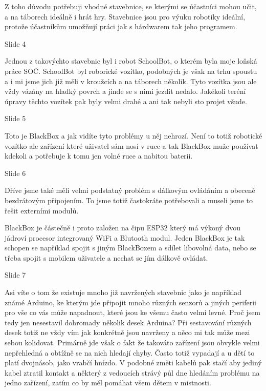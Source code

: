 Z toho důvodu potřebuji 
vhodné stavebnice, se kterými se účastníci mohou učit, a na táborech ideálně i hrát hry.
Stavebnice jsou pro výuku robotiky ideální, protože účastníkům umožňují práci jak 
s hárdwarem tak jeho programem.

Slide 4

Jednou z takovýchto stavebnic byl i robot SchoolBot, o kterém byla moje loňská práce SOČ.
SchoolBot byl roborické vozítko, podobných je však na trhu spoustu a i mi jsme jich již měli v kroužcích
a na táborech několik. Tyto vozítka jsou ale vždy vázány na hladký povrch a jinde se s nimi jezdit nedalo.
Jakékoli teréní úpravy těchto vozítek pak byly velmi drahé a ani tak nebyli sto projet všude.

Slide 5

Toto je BlackBox a jak vidíte tyto problémy u něj nehrozí. Není to totiž robotické vozítko ale zařízení které uživatel
sám nosí v ruce a tak BlackBox muže používat kdekoli a potřebuje k tomu jen volné ruce a nabitou baterii.



Slide 6

Dříve jsme také měli velmi podstatný problém s dálkovým ovládáním a obeceně bezdrátovým připojením.
To jsme totiž častokráte potřebovali a museli jsme to řešit externími modulů.

BlackBox je částečně i proto založen na čipu ESP32 který má výkoný dvou jádroví procesor integrovaný WiFi a Blutooth modul. 
Jeden BlackBox je tak schopen se například spojit s jiným BlackBoxem a sdílet libovolná data, 
nebo se třeba spojit s mobilem uživatele a nechat se jím dálkově ovládat. %



Slide 7

Asi víte o tom že existuje mnoho již navržených stavebnic jako je například známé Arduino, 
ke kterým jde připojit mnoho různých senzorů a jiných periferii pro vše co vás může napadnout, které jsou ke všemu 
často velmi levné. 
Proč jsem tedy jen nesestavil dohromady několik desek Arduina? Při sestavování různých desek
totiž ne vždy vím jak konkrétně jsou navrženy a něco mi tak může mezi sebou kolidovat.
Primárně jde však o fakt že takováto zařízení jsou obvykle velmi nepřehledná a obtížně 
se na nich hledají chyby. Často totiž vypadají a u dětí to platí dvojnásob, jako vrabčí hnízdo.
V podobné změti kabelů pak stačí aby jediný kabel ztratil kontakt a některý z vedoucích 
strávý půl dne hledáním problému na jedno zařízení, zatím co by měl pomáhat všem dětem v místnosti.

